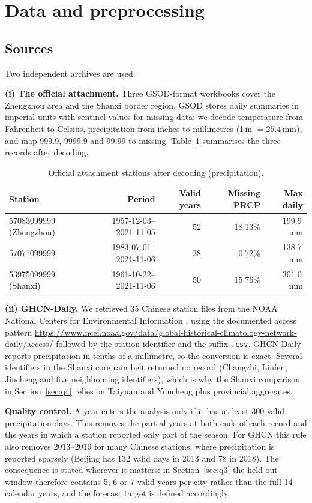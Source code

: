 \section{Data and preprocessing}\label{sec:data}

\subsection{Sources}

Two independent archives are used.

\textbf{(i) The official attachment.} Three GSOD-format workbooks cover the Zhengzhou area and the Shanxi border region. GSOD stores daily summaries in imperial units with sentinel values for missing data; we decode temperature from Fahrenheit to Celsius, precipitation from inches to millimetres (1\,in $=25.4$\,mm), and map 999.9, 9999.9 and 99.99 to missing. Table~\ref{tab:attach} summarises the three records after decoding.

\begin{table}[H]
\centering
\caption{Official attachment stations after decoding (precipitation).}
\label{tab:attach}
\small
\begin{tabular}{lrrrr}
\toprule
Station & Period & Valid years & Missing PRCP & Max daily\\
\midrule
57083099999 (Zhengzhou) & 1957-12-03--2021-11-05 & 52 & 18.13\% & 199.9\,mm\\
57071099999 & 1983-07-01--2021-11-06 & 38 & 0.72\% & 138.7\,mm\\
53975099999 (Shanxi) & 1961-10-22--2021-11-06 & 50 & 15.76\% & 301.0\,mm\\
\bottomrule
\end{tabular}
\end{table}

\textbf{(ii) GHCN-Daily.} We retrieved 35 Chinese station files from the NOAA National Centers for Environmental Information \cite{menne2012}, using the documented access pattern \url{https://www.ncei.noaa.gov/data/global-historical-climatology-network-daily/access/} followed by the station identifier and the suffix \texttt{.csv}. GHCN-Daily reports precipitation in tenths of a millimetre, so the conversion is exact. Several identifiers in the Shanxi core rain belt returned no record (Changzhi, Linfen, Jincheng and five neighbouring identifiers), which is why the Shanxi comparison in Section~\ref{sec:q4} relies on Taiyuan and Yuncheng plus provincial aggregates.

\textbf{Quality control.} A year enters the analysis only if it has at least 300 valid precipitation days. This removes the partial years at both ends of each record and the years in which a station reported only part of the season. For GHCN this rule also removes 2013--2019 for many Chinese stations, where precipitation is reported sparsely (Beijing has 132 valid days in 2013 and 78 in 2018). The consequence is stated wherever it matters: in Section~\ref{sec:q3} the held-out window therefore contains 5, 6 or 7 valid years per city rather than the full 14 calendar years, and the forecast target is defined accordingly.

